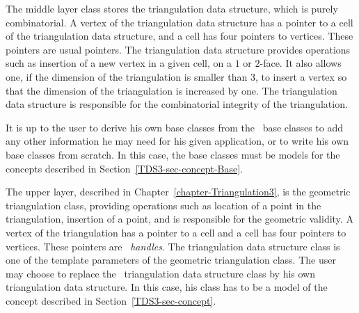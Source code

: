 The middle layer class stores the triangulation data structure, which
is purely combinatorial. A vertex of the triangulation data structure
has a pointer to a cell of the triangulation data structure, and a
cell has four pointers to vertices. These pointers are usual
 pointers. The triangulation data structure provides
operations such as insertion of a new vertex in a given cell, on a
$1$ or $2$-face. It also allows one, if the dimension of the triangulation
is smaller than $3$, to insert a vertex so that the dimension of the
triangulation is increased by one. The triangulation data
structure is responsible for the combinatorial integrity of the
triangulation. 

It is up to the user to derive his own base classes from the \cgal\
base classes to add any other information he may need for his given
application, or to write his own base classes from scratch. In this
case, the base classes must be models for the concepts described in
Section~\ref{TDS3-sec-concept-Base}.

The upper layer, described in Chapter~\ref{chapter-Triangulation3}, is
the geometric triangulation class, providing operations such as
location of a point in the triangulation, insertion of a point, and is
responsible for the geometric validity. A vertex of the triangulation
has a pointer to a cell and a cell has four pointers to
vertices. These pointers are \cgal\ \emph{handles}. The triangulation
data structure class is one of the template parameters of the
geometric triangulation class. The user may choose to replace the
\cgal\ triangulation data structure class by his own triangulation
data structure. In this case, his class has to be a model of the
concept described in Section~\ref{TDS3-sec-concept}.

